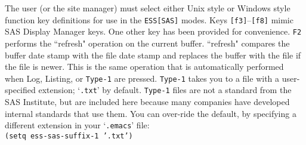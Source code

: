 \documentclass{article}
\newcommand{\stexttt}[1]{{\small\texttt{#1}}}
\newcommand{\file}[1]{`\stexttt{#1}'}
\begin{document}
The user (or the site manager) must select either Unix style or
Windows style function key definitions for use in the
\stexttt{ESS[SAS]} modes.
Keys \stexttt{[f3]}--\stexttt{[f8]} mimic SAS Display Manager keys.
One other key has been provided for convenience.  \stexttt{F2}
performs the ``refresh" operation on the current buffer.  ``refresh"
compares the buffer date stamp with the file date stamp and replaces
the buffer with the file if the file is newer.  This is the same
operation that is automatically performed when Log, Listing, or
\stexttt{Type-1} are pressed.  \stexttt{Type-1} takes you to a file
with a user-specified extension; \file{.txt} by default.
\stexttt{Type-1} files are not a standard from the SAS Institute, but
are included here because many companies have developed internal
standards that use them.  You can over-ride the default, by specifying
a different extension in your \file{.emacs} file:\\
\stexttt{(setq ess-sas-suffix-1 '.txt')}
\end{document}

